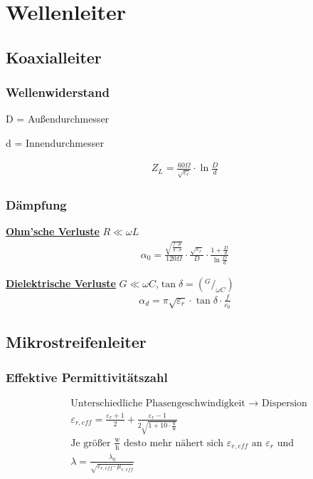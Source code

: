 \section{Wellenleiter}
\subsection{Koaxialleiter}
\subsubsection{Wellenwiderstand}


D = Außendurchmesser

d = Innendurchmesser

\begin{align*}
    Z_L = \frac{60\Omega}{\sqrt{\varepsilon_r}}\cdot \ln{\frac{D}{d}}
\end{align*}

\subsubsection{Dämpfung}
\underline{\textbf{Ohm'sche Verluste}} $R\ll\omega L$
\begin{align*}
    \alpha_0 = \frac{\sqrt{\frac{f\cdot\mu}{\pi\cdot\sigma}}}{120\Omega}\cdot\frac{\sqrt{\varepsilon_r}}{D}\cdot\frac{1+\frac{D}{d}}{\ln \frac{D}{d}}
\end{align*}

\underline{\textbf{Dielektrische Verluste}} $G\ll\omega C$,$\tan\delta= (^G/_{\omega C})$
\begin{align*}
    \alpha_d = \pi\sqrt{\varepsilon_r}\cdot\tan\delta\cdot\frac{f}{c_0}
\end{align*}
\subsection{Mikrostreifenleiter}

\subsubsection{Effektive Permittivitätszahl}
\begin{align*}
     & \text{Unterschiedliche Phasengeschwindigkeit $\rightarrow$ Dispersion}                                              \\
     & \varepsilon_{r,eff}  = \frac{\varepsilon_r+1}{2}+\frac{\varepsilon_r-1}{2\sqrt{1+10\cdot\frac{\text{h}}{\text{w}}}} \\
     & \text{Je größer $\frac{\text{w}}{\text{h}}$ desto mehr nähert sich $\varepsilon_{r,eff}$ an $\varepsilon_r$ und}    \\
     & \lambda              = \frac{\lambda_0}{\sqrt{\varepsilon_{r,eff}\cdot\mu_{r,eff}}}
\end{align*}
